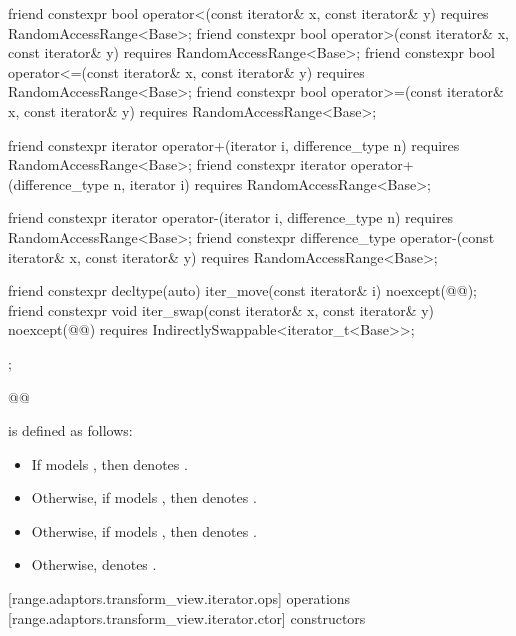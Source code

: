 \begin{codeblock}
{{    friend constexpr bool operator<(const iterator& x, const iterator& y)
      requires RandomAccessRange<Base>;
    friend constexpr bool operator>(const iterator& x, const iterator& y)
      requires RandomAccessRange<Base>;
    friend constexpr bool operator<=(const iterator& x, const iterator& y)
      requires RandomAccessRange<Base>;
    friend constexpr bool operator>=(const iterator& x, const iterator& y)
      requires RandomAccessRange<Base>;

    friend constexpr iterator operator+(iterator i, difference_type n)
      requires RandomAccessRange<Base>;
    friend constexpr iterator operator+(difference_type n, iterator i)
      requires RandomAccessRange<Base>;

    friend constexpr iterator operator-(iterator i, difference_type n)
      requires RandomAccessRange<Base>;
    friend constexpr difference_type operator-(const iterator& x, const iterator& y)
      requires RandomAccessRange<Base>;

    friend constexpr decltype(auto) iter_move(const iterator& i)
      noexcept(@\oldtxt{\seebelow}@);
    friend constexpr void iter_swap(const iterator& x, const iterator& y)
      noexcept(@\oldtxt{\seebelow}@)
      requires IndirectlySwappable<iterator_t<Base>>;
  };
}@\oldtxt{\}}@
\end{codeblock}

{\color{newclr}
\pnum
{} is defined as follows:
\begin{itemize}
\item If  models , then
 denotes .

\item Otherwise, if  models , then
 denotes .

\item Otherwise, if  models , then
 denotes .

\item Otherwise,  denotes .
\end{itemize}
} %

[range.adaptors.transform_view.iterator.ops]{ operations}
[range.adaptors.transform_view.iterator.ctor]{ constructors}

